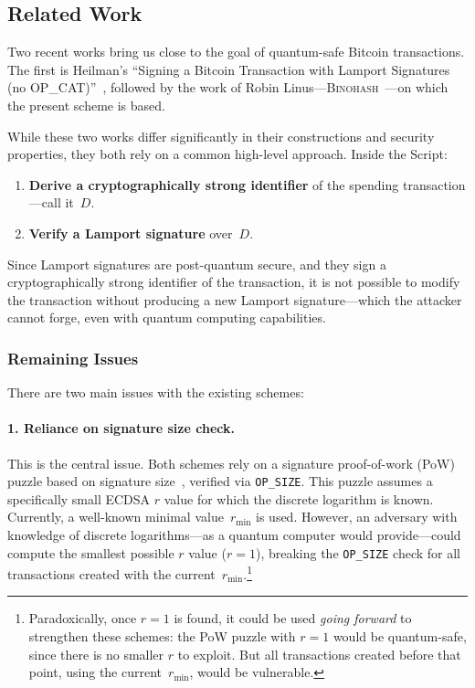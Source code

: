 \documentclass[11pt, a4paper]{article}
\begin{document}
\subsection{Related Work}
\label{sec:related-work}

Two recent works bring us close to the goal of quantum-safe Bitcoin transactions. The first is Heilman's ``Signing a Bitcoin Transaction with Lamport Signatures (no OP\_CAT)''~\cite{heilman2024}, followed by the work of Robin Linus---\textsc{Binohash}~\cite{linus2024binohash}---on which the present scheme is based.

While these two works differ significantly in their constructions and security properties, they both rely on a common high-level approach. Inside the Script:

\begin{enumerate}
    \item \textbf{Derive a cryptographically strong identifier} of the spending transaction---call it~$D$.
    \item \textbf{Verify a Lamport signature} over~$D$.
\end{enumerate}

Since Lamport signatures are post-quantum secure, and they sign a cryptographically strong identifier of the transaction, it is not possible to modify the transaction without producing a new Lamport signature---which the attacker cannot forge, even with quantum computing capabilities.

\subsubsection{Remaining Issues}
\label{sec:issues}

There are two main issues with the existing schemes:

\paragraph{1. Reliance on signature size check.}
This is the central issue. Both schemes rely on a signature proof-of-work (PoW) puzzle based on signature size~\cite{borco2024}, verified via \texttt{OP\_SIZE}. This puzzle assumes a specifically small ECDSA $r$ value for which the discrete logarithm is known. Currently, a well-known minimal value~$r_{\min}$ is used. However, an adversary with knowledge of discrete logarithms---as a quantum computer would provide---could compute the smallest possible $r$ value ($r = 1$), breaking the \texttt{OP\_SIZE} check for all transactions created with the current~$r_{\min}$.\footnote{Paradoxically, once $r = 1$ is found, it could be used \emph{going forward} to strengthen these schemes: the PoW puzzle with $r = 1$ would be quantum-safe, since there is no smaller $r$ to exploit. But all transactions created before that point, using the current~$r_{\min}$, would be vulnerable.}
\end{document}
